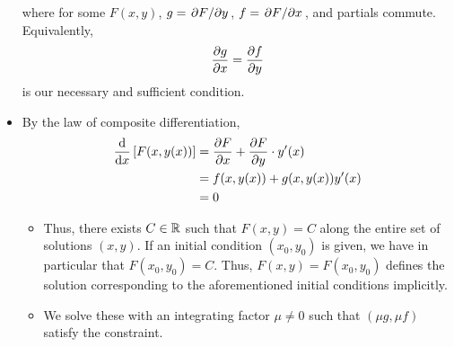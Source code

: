 \documentclass[../notes.tex]{subfiles}
\begin{document}
\begin{itemize}
    where for some $F(x,y)$, $g=\pdv*{F}{y}$, $f=\pdv*{F}{x}$, and partials commute. Equivalently,
    \begin{equation*}
        \pdv{g}{x} = \pdv{f}{y}
    \end{equation*}
    is our necessary and sufficient condition.
    \item By the law of composite differentiation,
    \begin{align*}
        \dv{x}\left[ F(x,y(x)) \right] &= \pdv{F}{x}(x,y(x))+\pdv{F}{y}(x,y(x))\cdot y'(x)\\
        &= f(x,y(x))+g(x,y(x))y'(x)\\
        &= 0
    \end{align*}
    \begin{itemize}
        \item Thus, there exists $C\in\mathbb{R}$ such that $F(x,y)=C$ along the entire set of solutions $(x,y)$. If an initial condition $(x_0,y_0)$ is given, we have in particular that $F(x_0,y_0)=C$. Thus, $F(x,y)=F(x_0,y_0)$ defines the solution corresponding to the aforementioned initial conditions implicitly.
        \item We solve these with an integrating factor $\mu\neq 0$ such that $(\mu g,\mu f)$ satisfy the constraint.
    \end{itemize}
\end{itemize}
\end{document}
